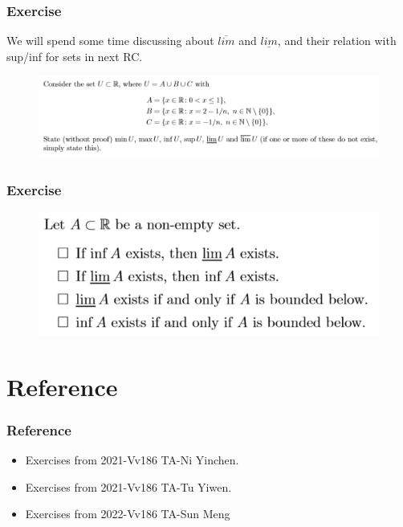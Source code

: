 \documentclass{beamer}
\begin{document}
\begin{frame}
    \frametitle{Exercise}

    We will spend some time discussing about $\overline{lim}$ and $\underline{lim}$, and their relation with sup/inf for sets in next RC.
    \begin{figure}[htbp]
        \centering
        \includegraphics[width=12cm]{extra2.png}
    \end{figure}
\end{frame}

\begin{frame}
    \frametitle{Exercise}
    \begin{figure}[htbp]
        \centering
        \includegraphics[width=12cm]{extra.png}
    \end{figure}
\end{frame}

\section{Reference}
\begin{frame}
    \frametitle{Reference}
    \begin{itemize}
        \item Exercises from 2021-Vv186 TA-Ni Yinchen.
        \item Exercises from 2021-Vv186 TA-Tu Yiwen.
        \item Exercises from 2022-Vv186 TA-Sun Meng
    \end{itemize}
\end{frame}
\end{document}
